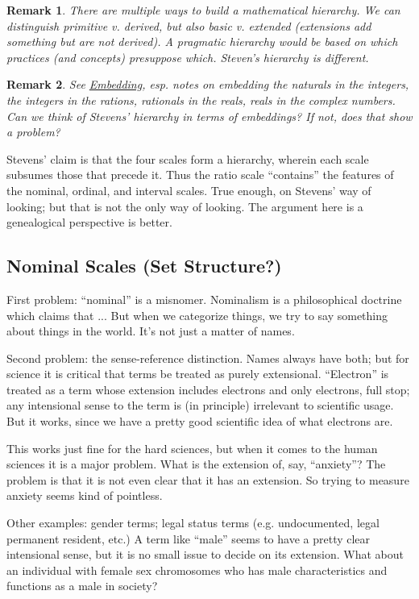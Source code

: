 \documentclass[11pt,twoside]{article}
\newtheorem{remark}{Remark}
\begin{document}
\begin{remark}
  There are multiple ways to build a mathematical hierarchy.  We can
  distinguish primitive v. derived, but also basic v. extended
  (extensions add something but are not derived).  A pragmatic
  hierarchy would be based on which practices (and concepts)
  presuppose which.  Steven's hierarchy is different.
\end{remark}

\begin{remark}
  See \href{http://en.wikipedia.org/wiki/Embedding}{Embedding},
  esp. notes on embedding the naturals in the integers, the integers
  in the rations, rationals in the reals, reals in the complex
  numbers.  Can we think of Stevens' hierarchy in terms of embeddings?
  If not, does that show a problem?
\end{remark}

Stevens' claim is that the four scales form a hierarchy, wherein each
scale subsumes those that precede it.  Thus the ratio scale
``contains'' the features of the nominal, ordinal, and interval
scales.  True enough, on Stevens' way of looking; but that is not the
only way of looking.  The argument here is a genealogical perspective
is better.

\subsection{Nominal Scales (Set Structure?)}

First problem: ``nominal'' is a misnomer.  Nominalism is a
philosophical doctrine which claims that ...  But when we categorize
things, we try to say something about things in the world.  It's not
just a matter of names.

Second problem: the sense-reference distinction.  Names always have
both; but for science it is critical that terms be treated as purely
extensional.  ``Electron'' is treated as a term whose extension
includes electrons and only electrons, full stop; any intensional
sense to the term is (in principle) irrelevant to scientific usage.
But it works, since we have a pretty good scientific idea of what
electrons are.

This works just fine for the hard sciences, but when it comes to the
human sciences it is a major problem.  What is the extension of, say,
``anxiety''?  The problem is that it is not even clear that it has an
extension.  So trying to measure anxiety seems kind of pointless.

Other examples: gender terms; legal status terms (e.g. undocumented,
legal permanent resident, etc.)  A term like ``male'' seems to have a
pretty clear intensional sense, but it is no small issue to decide on
its extension.  What about an individual with female sex chromosomes
who has male characteristics and functions as a male in society?
\end{document}
